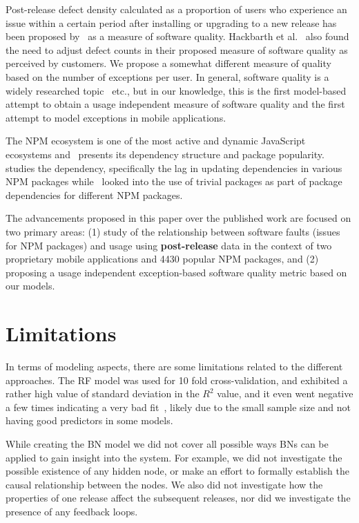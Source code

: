 \documentclass[smallextended]{svjour3}       %
\begin{document}
Post-release defect density calculated as a proportion of users who experience an issue within a certain period after installing or upgrading to a new release has been proposed by~\cite{mockus2008interval,mockus2005predictors} as a measure of software quality.  Hackbarth et al.~\cite{hackbarth2016improving} also found the need to adjust defect counts in their proposed measure of software quality as perceived by customers. We propose a somewhat different measure of quality based on the number of exceptions per user. In general, software quality is a widely researched topic~\cite{kan2002metrics,kitchenham1996software,schulmeyer1992handbook} etc., but in our knowledge, this is the first model-based attempt to obtain a usage independent measure of software quality and the first attempt to model exceptions in mobile applications.

The NPM ecosystem is one of the most active and dynamic JavaScript ecosystems and~\cite{wittern2016look} presents its dependency structure and package popularity.~\cite{zerouali2018empirical} studies the dependency, specifically the lag in updating dependencies in various NPM packages while~\cite{abdalkareem2017developers} looked into the use of trivial packages as part of package dependencies for different NPM packages. 


The advancements proposed in this paper over the published work are focused 
on two primary areas: (1) study of the relationship between software faults (issues for NPM packages) and usage using \textbf{post-release} data in the context of two proprietary mobile applications and 4430 popular NPM packages, and (2) proposing a usage independent exception-based software quality metric based on our models.

\section{Limitations}\label{s:limitation}

In terms of modeling aspects, there are some limitations related to the different approaches.
 The RF model was used for 10 fold cross-validation, and exhibited a rather high value of standard deviation in the $R^2$ value, and it even went negative a few times indicating a very bad fit~\cite{negRsq},  likely due to the small sample size and not having good predictors in some models.

While creating the BN model we did not cover all possible ways BNs can be applied to gain insight into the system. For example, we did not investigate the possible existence of any hidden node, or make an effort to formally establish the causal relationship between the nodes. We also did not investigate how the properties of one release affect the subsequent releases, nor did we investigate the presence of any feedback loops.
\end{document}
